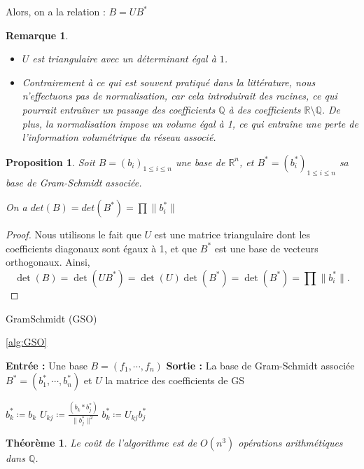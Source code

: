 \documentclass[a4paper,12pt]{report}  %
\theoremstyle{definitionstyle}
\theoremstyle{examplestyle}
\theoremstyle{remarkstyle}
\newtheorem{remark}{Remarque}[chapter] %
\theoremstyle{propositionstyle}
\newtheorem{proposition}{Proposition}[chapter]  %
\theoremstyle{theoremstyle}
\newtheorem{theoreme}{Théorème}[chapter]  %
\theoremstyle{proofstyle}
\begin{document}
Alors, on a la relation : $B = UB^*$
	
	 \begin{remark}
	 	\begin{itemize}
	 		\item  $U$ est triangulaire avec un déterminant égal à $1$.
	 		\item Contrairement à ce qui est souvent pratiqué dans la littérature, nous n'effectuons pas de normalisation, car cela introduirait des racines, ce qui pourrait entraîner un passage des coefficients \( \mathbb{Q} \) à des coefficients \( \mathbb{R} \setminus \mathbb{Q} \). De plus, la normalisation impose un volume égal à 1, ce qui entraîne une perte de l'information volumétrique du réseau associé.
	 		
	 	\end{itemize}
 	\end{remark}
	
	
	\begin{proposition}
		 Soit $B = (b_i)_{1 \leq i \leq n}$ une base de $\mathbb{R}^n$, et $B^* = (b^*_i)_{1 \leq i \leq n}$ sa base de Gram-Schmidt associée.
		 
		 On a $det(B)=det(B^*) = \prod \| b_i^*\|$
	\end{proposition}	

	\begin{proof}
		Nous utilisons le fait que \( U \) est une matrice triangulaire dont les coefficients diagonaux sont égaux à 1, et que \( B^* \) est une base de vecteurs orthogonaux. Ainsi, 
		\[\det(B) = \det(UB^*) = \det(U)\det(B^*) = \det(B^*) = \prod \| b_i^*\|.\]
	\end{proof}
	
	
	
	
	\begin{algorithm}
		\caption{GramSchmidt (GSO)}
		\label{alg:GSO} 
		\ref{alg:GSO}
		
		\begin{algorithmic}[1]
			\State \textbf{Entrée :} Une base $B=(f_1, \cdots, f_n)$
			\State \textbf{Sortie :} La base de Gram-Schmidt associée $B^*=(b^*_1, \cdots, b^*_n)$ et $U$ la matrice des coefficients de GS
			
			\State $b_k^* \coloneqq b_k$
			\State $U_{kj}\coloneqq \frac{(b_k*b_j^*)}{\|b_j^*\|^2}$
			\State $b_k^* \coloneqq U_{kj} b_j^*$
			\EndFor
			\EndFor
		\end{algorithmic}
	\end{algorithm}
	\begin{theoreme}
		Le coût de l'algorithme  est de \( O(n^3) \) opérations arithmétiques dans \( \mathbb{Q} \).
	\end{theoreme}
	
\end{document}
